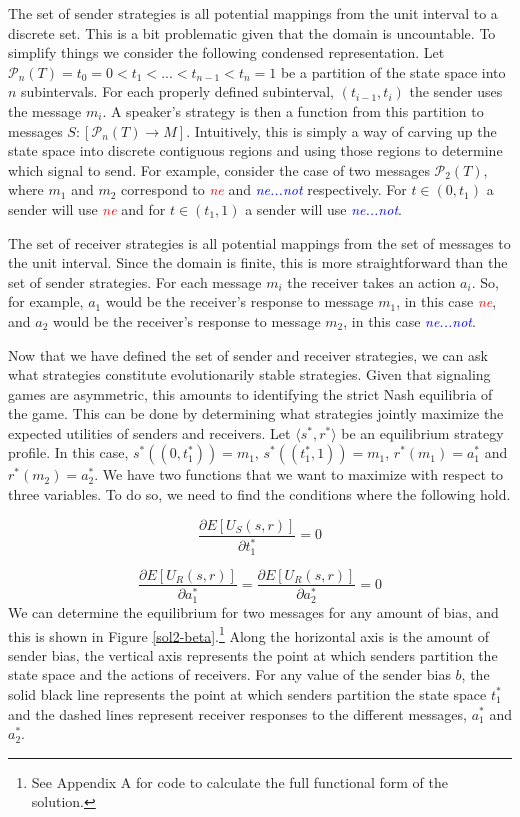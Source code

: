 \documentclass[12pt]{upenndiss}
\theoremstyle{definition} \newtheorem{definition}{Definition}
\begin{document}
The set of sender strategies is all potential mappings from the unit interval to a discrete set. This is a bit problematic given that the domain is uncountable. To simplify things we consider the following condensed representation. Let $\mathcal{P}_n(T)= t_0 = 0 < t_1 < ... < t_{n-1} < t_n = 1$ be a partition of the state space into $n$ subintervals.  For each properly defined subinterval, $(t_{i-1},t_i)$ the sender uses the message $m_i$. A speaker's strategy is then a function from this partition to messages $S : [\mathcal{P}_n(T) \rightarrow M]$.  Intuitively, this is simply a way of carving up the state space into discrete contiguous regions and using those regions to determine which signal to send. For example, consider the case of two messages $\mathcal{P}_2(T)$, where $m_1$ and $m_2$ correspond to \textcolor{red}{\emph{ne}} and \textcolor{blue}{\emph{ne...not}} respectively. For $t \in (0, t_1)$ a sender will use  \textcolor{red}{\emph{ne}} and for $t \in (t_1, 1)$ a sender will use \textcolor{blue}{\emph{ne...not}}.

The set of receiver strategies is all potential mappings from the set of messages to the unit interval. Since the domain is finite, this is more straightforward than the set of sender strategies. For each message $m_i$ the receiver takes an action $a_i$. So, for example, $a_1$ would be the receiver's response to message $m_1$, in this case \textcolor{red}{\emph{ne}}, and $a_2$ would be the receiver's response to message $m_2$, in this case \textcolor{blue}{\emph{ne...not}}.

Now that we have defined the set of sender and receiver strategies, we can ask what strategies constitute evolutionarily stable strategies. Given that signaling games are asymmetric, this amounts to identifying the strict Nash equilibria of the game. This can be done by determining what strategies jointly maximize the expected utilities of senders and receivers. Let $\langle s^*, r^* \rangle$ be an equilibrium strategy profile. In this case, $s^*((0, t_1^*)) = m_1$, $s^*((t_1^*, 1)) = m_1$, $r^*(m_1) = a_1^*$ and $r^*(m_2) = a_2^*$. We have two functions that we want to maximize with respect to three variables. To do so, we need to find the conditions where the following hold.

\begin{equation}
	\frac{\partial E[U_S(s, r)]}{\partial t_1^*} = 0
\end{equation}

\begin{equation}
	\frac{\partial E[U_R(s, r)]}{\partial a_1^*} = \frac{\partial E[U_R(s, r)]}{\partial a_2^*} = 0
\end{equation}
We can determine the equilibrium for two messages for any amount of bias, and this is shown in Figure \ref{sol2-beta}.\footnote{See Appendix A for code to calculate the full functional form of the solution.} Along the horizontal axis is the amount of sender bias, the vertical axis represents the point at which senders partition the state space and the actions of receivers. For any value of the sender bias $b$, the solid black line represents the point at which senders partition the state space $t_1^*$ and the dashed lines represent receiver responses to the different messages, $a_1^*$ and $a_2^*$.
\end{document}
